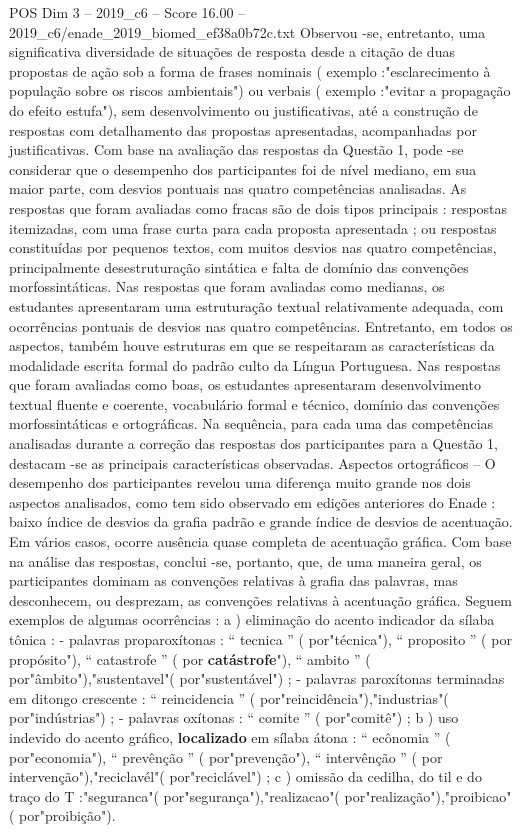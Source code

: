 \begin{textsample}{POS Dim 3 – 2019\_c6 – Score 16.00 – 2019\_c6/enade\_2019\_biomed\_ef38a0b72c.txt}
Observou -se, entretanto, uma significativa diversidade de situações de resposta desde a citação de duas propostas de ação sob a forma de frases nominais ( exemplo :"esclarecimento à população sobre os riscos ambientais") ou verbais ( exemplo :"evitar a propagação do efeito estufa"), sem desenvolvimento ou justificativas, até a construção de respostas com detalhamento das propostas apresentadas, acompanhadas por justificativas.
Com base na avaliação das respostas da Questão 1, pode -se considerar que o desempenho dos participantes foi de nível mediano, em sua maior parte, com desvios pontuais nas quatro competências analisadas.
As respostas que foram avaliadas como fracas são de dois tipos principais : respostas itemizadas, com uma frase curta para cada proposta apresentada ; ou respostas constituídas por pequenos textos, com muitos desvios nas quatro competências, principalmente desestruturação sintática e falta de domínio das convenções morfossintáticas.
Nas respostas que foram avaliadas como medianas, os estudantes apresentaram uma estruturação textual relativamente adequada, com ocorrências pontuais de desvios nas quatro competências.
Entretanto, em todos os aspectos, também houve estruturas em que se respeitaram as características da modalidade escrita formal do padrão culto da Língua Portuguesa.
Nas respostas que foram avaliadas como boas, os estudantes apresentaram desenvolvimento textual fluente e coerente, vocabulário formal e técnico, domínio das convenções morfossintáticas e ortográficas.
Na sequência, para cada uma das competências analisadas durante a correção das respostas dos participantes para a Questão 1, destacam -se as principais características observadas.
Aspectos ortográficos – O desempenho dos participantes revelou uma diferença muito grande nos dois aspectos analisados, como tem sido observado em edições anteriores do Enade : baixo índice de desvios da grafia padrão e grande índice de desvios de acentuação.
Em vários casos, ocorre ausência quase completa de acentuação gráfica.
Com base na análise das respostas, conclui -se, portanto, que, de uma maneira geral, os participantes dominam as convenções relativas à grafia das palavras, mas desconhecem, ou desprezam, as convenções relativas à acentuação gráfica.
Seguem exemplos de algumas ocorrências : a ) eliminação do acento indicador da sílaba tônica : - palavras proparoxítonas : “ tecnica ” ( por"técnica"), “ proposito ” ( por propósito"), “ catastrofe ” ( por \textbf{catástrofe}"), “ ambito ” ( por"âmbito"),"sustentavel"( por"sustentável") ; - palavras paroxítonas terminadas em ditongo crescente : “ reincidencia ” ( por"reincidência"),"industrias"( por"indústrias") ; - palavras oxítonas : “ comite ” ( por"comitê") ; b ) uso indevido do acento gráfico, \textbf{localizado} em sílaba átona : “ ecônomia ” ( por"economia"), “ prevênção ” ( por"prevenção"), “ intervênção ” ( por intervenção"),"reciclavél"( por"reciclável") ; c ) omissão da cedilha, do til e do traço do T :"seguranca"( por"segurança"),"realizacao"( por"realização"),"proibicao"( por"proibição").

\end{textsample}
